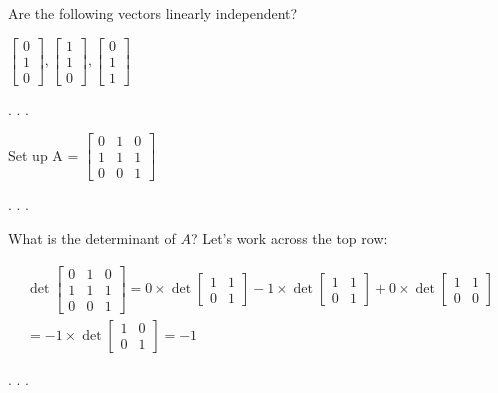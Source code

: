 \documentclass[
  letterpaper,
  DIV=11,
  numbers=noendperiod]{scrartcl}
\begin{document}
Are the following vectors linearly independent?

\(\left[\begin{array}{l}0 \\ 1 \\ 0\end{array}\right],\left[\begin{array}{l}1 \\ 1 \\ 0\end{array}\right],\left[\begin{array}{l}0 \\ 1 \\ 1\end{array}\right]\)

. . .

Set up A =
\(\left[\begin{array}{lll}0 & 1 & 0 \\ 1 & 1 & 1 \\ 0 & 0 & 1\end{array}\right]\)

. . .

What is the determinant of \(A\)? Let's work across the top row:

\[
\begin{gather}
\operatorname{det}\left[\begin{array}{lll}
0 & 1 & 0 \\
1 & 1 & 1 \\
0 & 0 & 1
\end{array}\right]
= 0 \times \operatorname{det}\left[\begin{array}{ll}
1 & 1 \\
0 & 1
\end{array}\right]
- 1 \times \operatorname{det}\left[\begin{array}{ll}
1 & 1 \\
0 & 1
\end{array}\right] 
+ 0 \times \operatorname{det}\left[\begin{array}{ll}
1 & 1 \\
0 & 0
\end{array}\right] \\
= -1 \times \operatorname{det}\left[\begin{array}{ll}
1 & 0 \\
0 & 1
\end{array}\right]
= -1
\end{gather}
\]

. . .
\end{document}
